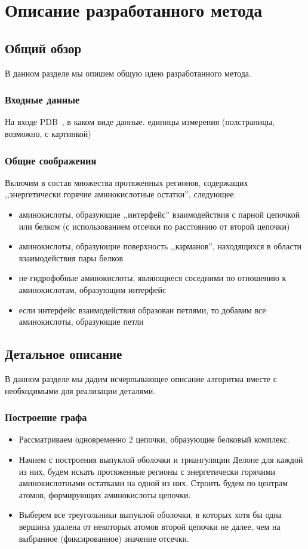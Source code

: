 \chapter{Описание разработанного метода}

\section{Общий обзор}
В данном разделе мы опишем общую идею разработанного метода.

\subsection{Входные данные}
На входе PDB~\cite{pdb}, в каком виде данные. единицы измерения
(полстраницы, возможно, с картинкой)
\vspace{10cm}

\subsection{Общие соображения}
Включим в состав множества протяженных регионов, содержащих ,,энергетически горячие аминокислотные остатки'', следующее:
\begin{itemize}
\item аминокислоты, образующие ,,интерфейс'' взаимодействия с парной цепочкой или белком (с использованием отсечки по расстоянию от второй цепочки)
\item аминокислоты, образующие поверхность ,,карманов'', находящихся в области взаимодействия пары белков
\item не-гидрофобные аминокислоты, являющиеся соседними по отношению к аминокислотам, образующим интерфейс
\item если интерфейс взаимодействия образован петлями, то добавим все аминокислоты, образующие петли 
\end{itemize}

\section{Детальное описание}
В данном разделе мы дадим исчерпывающее описание алгоритма вместе с необходимыми для реализации деталями.
\subsection{Построение графа}
\begin{itemize}
\item Рассматриваем одновременно 2 цепочки, образующие белковый комплекс.
\item Начнем с построения выпуклой оболочки и триангуляции Делоне для каждой из них, будем искать протяженные регионы с энергетически горячими аминокислотными остатками  на одной из них. Строить будем по центрам атомов, формирующих аминокислоты цепочки.
\item Выберем все треугольники выпуклой оболочки, в которых хотя бы одна вершина удалена от некоторых атомов второй цепочки не далее, чем на выбранное (фиксированное) значение отсечки.
\end{itemize}


